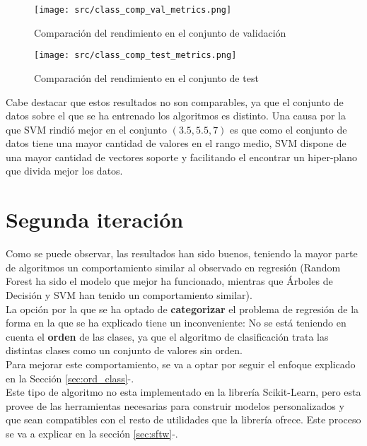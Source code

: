 \begin{figure}[H]
	\centering
	\texttt{[image: src/class\_comp\_val\_metrics.png]}
	\caption{Comparación del rendimiento en el conjunto de validación}
	\label{fig:class_cmp_val}
\end{figure}
\begin{figure}[H]
	\centering
	\texttt{[image: src/class\_comp\_test\_metrics.png]}
	\caption{Comparación del rendimiento en el conjunto de test}
	\label{fig:class_cmp_test}
\end{figure}
Cabe destacar que estos resultados no son comparables, ya que el conjunto de datos sobre el que se ha entrenado los algoritmos es distinto.
Una causa por la que  SVM rindió mejor en el conjunto $(3.5,5.5,7)$ es que como el conjunto de datos tiene una mayor cantidad de valores en el rango medio, SVM dispone de una mayor cantidad de vectores soporte y facilitando el encontrar un hiper-plano que divida mejor los datos.
\clearpage
\section{Segunda iteración}
\label{sec:ord}
Como se puede observar, las resultados han sido buenos, teniendo la mayor parte de algoritmos un comportamiento similar al observado en regresión (Random Forest ha sido el modelo que mejor ha funcionado, mientras que Árboles de Decisión y SVM han tenido un comportamiento similar).\\
La opción por la que se ha optado de \textbf{categorizar} el problema de regresión de la forma en la que se ha explicado tiene un inconveniente: No se está teniendo en cuenta el \textbf{orden} de las clases, ya que el algoritmo de clasificación trata las distintas clases como un conjunto de valores sin orden.\\
\linebreak
Para mejorar este comportamiento, se va a optar por seguir el enfoque explicado en la Sección \ref{sec:ord_class}-.\\
Este tipo de algoritmo no esta implementado en la librería Scikit-Learn, pero esta provee de las herramientas necesarias para construir modelos personalizados y que sean compatibles con el resto de utilidades que la librería ofrece. Este proceso se va a explicar en la sección \ref{sec:sftw}-.\\
\linebreak

